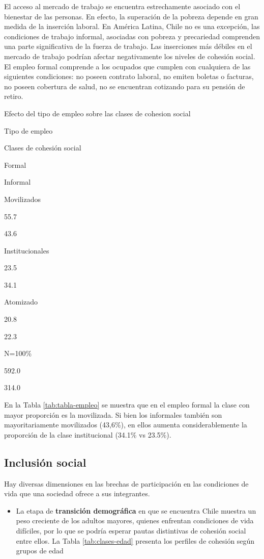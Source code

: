 \documentclass[
  12pt,
]{book}
\providecommand{\tightlist}{%
  \setlength{\itemsep}{0pt}\setlength{\parskip}{0pt}}
\begin{document}
El acceso al mercado de trabajo se encuentra estrechamente asociado con el bienestar de las personas. En efecto, la superación de la pobreza depende en gran medida de la inserción laboral. En América Latina, Chile no es una excepción, las condiciones de trabajo informal, asociadas con pobreza y precariedad comprenden una parte significativa de la fuerza de trabajo. Las inserciones más débiles en el mercado de trabajo podrían afectar negativamente los niveles de cohesión social. El empleo formal comprende a los ocupados que cumplen con cualquiera de las siguientes condiciones: no poseen contrato laboral, no emiten boletas o facturas, no poseen cobertura de salud, no se encuentran cotizando para su pensión de retiro.

\label{tab:tabla-empleo}Efecto del tipo de empleo sobre las clases de cohesion social

Tipo de empleo

Clases de cohesión social

Formal

Informal

Movilizados

55.7

43.6

Institucionales

23.5

34.1

Atomizado

20.8

22.3

N=100\%

592.0

314.0

En la Tabla \ref{tab:tabla-empleo} se muestra que en el empleo formal la clase con mayor proporción es la movilizada. Si bien los informales también son mayoritariamente movilizados (43,6\%), en ellos aumenta considerablemente la proporción de la clase institucional (34.1\% vs 23.5\%).

\hypertarget{inclusiuxf3n-social}{%
\subsection{Inclusión social}\label{inclusiuxf3n-social}}

Hay diversas dimensiones en las brechas de participación en las condiciones de vida que una sociedad ofrece a sus integrantes.

\begin{itemize}
\tightlist
\item
  La etapa de \textbf{transición demográfica} en que se encuentra Chile muestra un peso creciente de los adultos mayores, quienes enfrentan condiciones de vida difíciles, por lo que se podría esperar pautas distintivas de cohesión social entre ellos. La Tabla \ref{tab:clases-edad} presenta los perfiles de cohesión según grupos de edad
\end{itemize}
\end{document}

